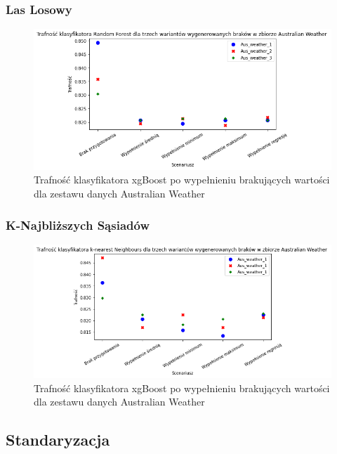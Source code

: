 \documentclass{book}
\begin{document}
\subsubsection{Las Losowy}

\begin{figure}[H]
    \centerline{\includegraphics[scale=0.5]{Aus_Weather_rfc_Wypełnienie_brakujących}}
    \centering
    \caption{Trafność klasyfikatora xgBoost po wypełnieniu brakujących wartości dla zestawu danych Australian Weather}
    \end{figure}

\subsubsection{K-Najbliższych Sąsiadów}
\begin{figure}[H]
    \centerline{\includegraphics[scale=0.5]{Aus_Weather_knn_Wypełnienie_brakujących}}
    \centering
    \caption{Trafność klasyfikatora xgBoost po wypełnieniu brakujących wartości dla zestawu danych Australian Weather}
    \end{figure}

\subsection{Standaryzacja}
\end{document}
